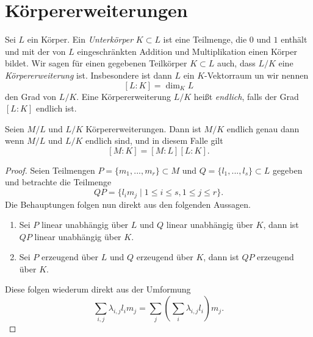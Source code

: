 \documentclass{book}
\begin{document}
\section{Körpererweiterungen}%
\label{sec:korpererweiterungen}

Sei $L$ ein Körper. Ein \emph{Unterkörper} $K \subset L$ ist eine Teilmenge,
die $0$ und $1$ enthält und mit der von $L$ eingeschränkten Addition und
Multiplikation einen Körper bildet. Wir sagen für einen gegebenen Teilkörper $K
\subset L$ auch, dass $L/K$ eine \emph{Körpererweiterung} ist. Insbesondere ist
dann $L$ ein $K$-Vektorraum un wir nennen
\[
    [L:K] = \dim_K L
\]
den Grad von $L/K$. Eine Körpererweiterung $L/K$ heißt \emph{endlich}, falls
der Grad $[L:K]$ endlich ist.

\begin{lem}
    \label{lem:grad}
    Seien $M/L$ und $L/K$ Körpererweiterungen. Dann ist $M/K$ endlich genau
    dann wenn $M/L$ und $L/K$ endlich sind, und in diesem Falle gilt
    \[
        [M:K] = [M:L][L:K].
    \]
\end{lem}
\begin{proof}
    Seien Teilmengen $P=\{m_1, ..., m_r\} \subset M$ und $Q=\{l_1, ..., l_s \} \subset L$ gegeben und betrachte die Teilmenge 
    \[
        QP = \{l_i m_j\; | \; 1 \le i \le s, 1 \le j \le r\}.
    \]
    Die Behauptungen folgen nun direkt aus den folgenden Aussagen. 
    \begin{enumerate}
        \item Sei $P$ linear unabhängig über $L$ und $Q$ linear unabhängig über
            $K$, dann ist $QP$ linear unabhängig über $K$.
        \item Sei $P$ erzeugend über $L$ und $Q$ erzeugend über
            $K$, dann ist $QP$ erzeugend über $K$.
    \end{enumerate}
    Diese folgen wiederum direkt aus der Umformung
    \[
        \sum_{i,j} \lambda_{i,j} l_i m_j = \sum_j ( \sum_{i} \lambda_{i,j} l_i ) m_j .
    \]
\end{proof}
\end{document}
